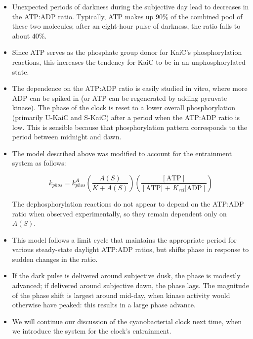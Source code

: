 \documentclass{article}
\begin{document}
\begin{itemize}
\item Unexpected periods of darkness during the subjective day lead to decreases in the ATP:ADP ratio. Typically, ATP makes up 90\% of the combined pool of these two molecules; after an eight-hour pulse of darkness, the ratio falls to about 40\%.

\item Since ATP serves as the phosphate group donor for KaiC's phosphorylation reactions, this increases the tendency for KaiC to be in an unphosphorylated state.

\item The dependence on the ATP:ADP ratio is easily studied in vitro, where more ADP can be spiked in (or ATP can be regenerated by adding pyruvate kinase). The phase of the clock is reset to a lower overall phosphorylation (primarily U-KaiC and S-KaiC) after a period when the ATP:ADP ratio is low. This is sensible because that phosphorylation pattern corresponds to the period between midnight and dawn.

\item The model described above was modified to account for the entrainment system as follows:

\[k_{phos} = k_{phos}^A \left( \frac{A(S)}{K + A(S)} \right) \left( \frac{[\textrm{ATP}]}{[\textrm{ATP] + $K_{rel}$[ADP}]} \right) \]

The dephosphorylation reactions do not appear to depend on the ATP:ADP ratio when observed experimentally, so they remain dependent only on $A(S)$.

\item This model follows a limit cycle that maintains the appropriate period for various steady-state daylight ATP:ADP ratios, but shifts phase in response to sudden changes in the ratio.

\item If the dark pulse is delivered around subjective dusk, the phase is modestly advanced; if delivered around subjective dawn, the phase lags. The magnitude of the phase shift is largest around mid-day, when kinase activity would otherwise have peaked: this results in a large phase advance.

\item We will continue our discussion of the cyanobacterial clock next time, when we introduce the system for the clock's entrainment.
\end{itemize}
\end{document}
